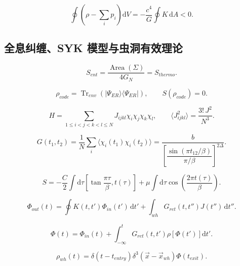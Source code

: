 \documentclass[UTF8,11pt,a4paper]{ctexart}
\newcommand{\Tr}{\operatorname{Tr}}
\newcommand{\Area}{\operatorname{Area}}
\newcommand{\dd}{\mathrm{d}}
\begin{document}
\[
\oint\left(\rho-\sum_i p_i\right)\dd V
=-\frac{c^4}{G}\oint K\,\dd A<0.
\]

\subsection{全息纠缠、SYK 模型与虫洞有效理论}

\[
S_{ent}=\frac{\Area(\Sigma)}{4G_N}=S_{thermo}.
\]

\[
\rho_{code}=\Tr_{env}\left(|\Psi_{ER}\rangle\langle\Psi_{ER}|\right),
\qquad S(\rho_{code})=0.
\]

\[
H=\sum_{1\le i<j<k<l\le N}J_{ijkl}\chi_i\chi_j\chi_k\chi_l,
\qquad
\langle J_{ijkl}^2\rangle=\frac{3!\,J^2}{N^3}.
\]

\[
G(t_1,t_2)=\frac1N\sum_i\langle\chi_i(t_1)\chi_i(t_2)\rangle
=\frac{b}{\left[\dfrac{\sin(\pi t_{12}/\beta)}{\pi/\beta}\right]^{2\Delta}}.
\]

\[
S=-\frac{C}{2}\int\dd\tau
\left[\tan\frac{\pi\tau}{\beta},t(\tau)\right]
+\mu\int\dd\tau\cos\left(\frac{2\pi t(\tau)}{\beta}\right).
\]

\[
\Phi_{out}(t)=\oint K(t,t')\Phi_{in}(t')\,\dd t'
+\int_{wh}G_{ret}(t,t'')J(t'')\,\dd t''.
\]

\[
\Phi(t)=\Phi_{in}(t)
+\int_{-\infty}^{t}G_{ret}(t,t')\rho\left[\Phi(t')\right]\dd t'.
\]

\[
\rho_{wh}(t)=\delta(t-t_{entry})
\delta^3\left(\vec x-\vec x_{wh}\right)\Phi(t_{exit}).
\]
\end{document}
